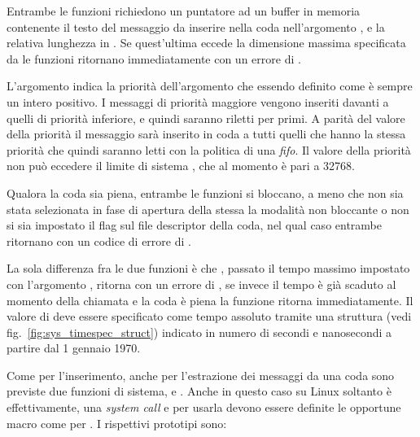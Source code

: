 Entrambe le funzioni richiedono un puntatore ad un buffer in memoria
contenente il testo del messaggio da inserire nella coda 
nell'argomento , e la relativa lunghezza in .
Se quest'ultima eccede la dimensione massima specificata da 
le funzioni ritornano immediatamente con un errore di .

L'argomento  indica la priorità dell'argomento che essendo
definito come  è sempre un intero positivo. I messaggi di
priorità maggiore vengono inseriti davanti a quelli di priorità inferiore, e
quindi saranno riletti per primi. A parità del valore della priorità il
messaggio sarà inserito in coda a tutti quelli che hanno la stessa priorità
che quindi saranno letti con la politica di una \textit{fifo}. Il valore della
priorità non può eccedere il limite di sistema , che al
momento è pari a 32768.

Qualora la coda sia piena, entrambe le funzioni si bloccano, a meno che non
sia stata selezionata in fase di apertura della stessa la modalità non
bloccante o non si sia impostato il flag  sul file
descriptor della coda, nel qual caso entrambe ritornano con un codice di
errore di .

La sola differenza fra le due funzioni è che , passato il
tempo massimo impostato con l'argomento , ritorna con un
errore di , se invece il tempo è già scaduto al momento
della chiamata e la coda è piena la funzione ritorna immediatamente. Il valore
di  deve essere specificato come tempo assoluto tramite
una struttura  (vedi fig.~\ref{fig:sys_timespec_struct})
indicato in numero di secondi e nanosecondi a partire dal 1 gennaio 1970.

Come per l'inserimento, anche per l'estrazione dei messaggi da una coda sono
previste due funzioni di sistema,  e
. Anche in questo caso su Linux soltanto
 è effettivamente, una \textit{system call} e per
usarla devono essere definite le opportune macro come per
. I rispettivi prototipi sono:

